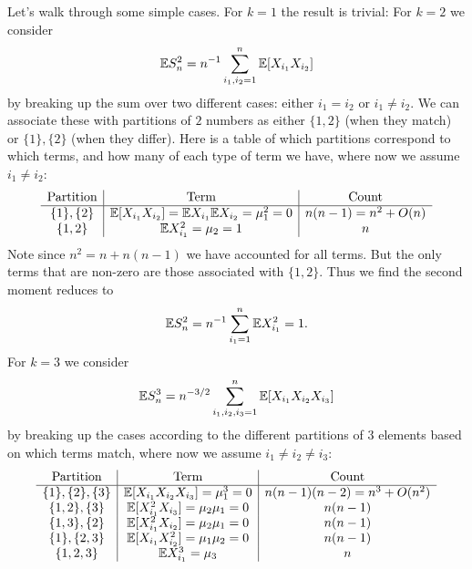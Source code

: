 Let's walk through some simple cases. For $k= 1$ the result is trivial:
For $k = 2$ we consider
\[
{\mathbb E} S_n^2 = n^{-1} \sum_{i_1,i_2=1}^n {\mathbb E}[X_{i_1}X_{i_2}]
\]
by breaking up the sum over two different cases: either $i_1 = i_2$ or $i_1 \ensuremath{\neq} i_2$.  We can associate these with partitions of $2$ numbers as either $\{1,2\}$ (when they match) or $\{1\}, \{2 \}$ (when they differ). Here is a table of which partitions correspond to which terms, and how many of each type of term we have, where now we assume $i_1 \ensuremath{\neq} i_2$:
\[
\begin{array}{c | c | c}
\hbox{Partition} & \hbox{Term} & \hbox{Count} \\
\hline
  \{1\}, \{2\} & {\mathbb E}[X_{i_1} X_{i_2}] = {\mathbb E} X_{i_1} {\mathbb E} X_{i_2}  = \mu_1^2  = 0  & n(n-1) = n^2 + O(n)\\
    \{1,2\} & {\mathbb E} X_{i_1}^2 = \mu_2 = 1 &  n
\end{array}
\]
Note since $n^2 = n + n(n-1)$ we have accounted for all terms. But the only terms that are non-zero are those associated with $\{1,2\}$. Thus we find the second moment reduces to
\[
{\mathbb E} S_n^2 = n^{-1} \sum_{i_1=1}^n  {\mathbb E} X_{i_1}^2 = 1.
\]
For $k = 3$ we consider
\[
{\mathbb E} S_n^3 = n^{-3/2} \sum_{i_1,i_2,i_3=1}^n {\mathbb E}[X_{i_1}X_{i_2}X_{i_3}]
\]
by breaking up the cases according to the different partitions of 3 elements based on which terms match, where  now we assume $i_1 \ensuremath{\neq} i_2 \ensuremath{\neq} i_3$:
\[
\begin{array}{c | c | c}
\hbox{Partition} & \hbox{Term} & \hbox{Count} \\
\hline
  \{1\}, \{2\} , \{3\}  & {\mathbb E}[X_{i_1} X_{i_2} X_{i_3}] =\mu_1^3  = 0  &  n(n-1)(n-2) = n^3 + O(n^2) \\
  \{1,2\}, \{3\}  & {\mathbb E}[X_{i_1}^2 X_{i_3}] =\mu_2 \mu_1  = 0  & n(n-1) \\
  \{1,3\}, \{2\}  & {\mathbb E}[X_{i_1}^2 X_{i_2}] =\mu_2 \mu_1  = 0  & n(n-1) \\
  \{1\}, \{2,3\}  & {\mathbb E}[X_{i_1} X_{i_2}^2] =\mu_1 \mu_2  = 0  & n(n-1) \\
  \{1,2,3\}  & {\mathbb E} X_{i_1}^3 = \mu_3   &  n 
\end{array}
\]
